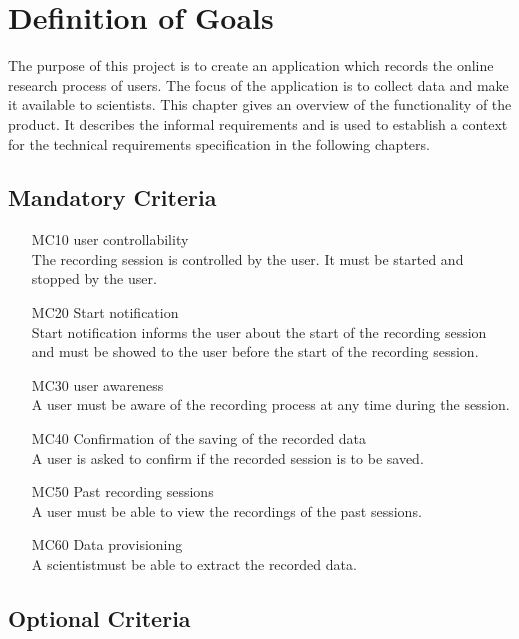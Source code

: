 \chapter{Definition of Goals}
\label{ch:goals}

The purpose of this project is to create an application which records the online research process of \glspl{user}. The focus of the application is to collect data and make it available to \glspl{scientist}. This chapter gives an overview of the functionality of the product. It describes the informal requirements and is used to establish a context for the technical requirements specification in the following chapters.

\section{Mandatory Criteria}

\begin{itemize}

	\item[MC10]\Gls{user} controllability\\The recording \gls{session} is controlled by the \gls{user}. It must be started and stopped by the \gls{user}.
	\item[MC20]Start notification\\Start notification informs the \gls{user} about the start of the recording \gls{session} and must be showed to the user before the start of the recording \gls{session}. 
	\item[MC30]\Gls{user} awareness\\A \gls{user} must be aware of the recording process at any time during the \gls{session}.
	\item[MC40]Confirmation of the saving of the recorded data\\A \gls{user} is asked to confirm if the recorded \gls{session} is to be saved.
	\item[MC50]Past recording \glspl{session}\\A \gls{user} must be able to view the recordings of the past \glspl{session}.
	\item[MC60]Data provisioning\\A \gls{scientist}must be able to extract the recorded data.
	
\end{itemize}

\section{Optional Criteria}

